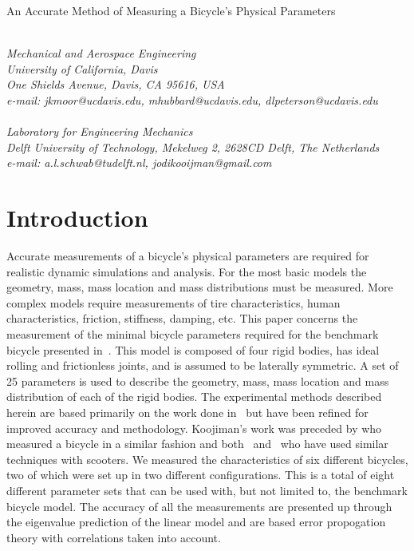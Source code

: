 \documentclass{bmd2010a}
\begin{document}
\begin{flushleft}
{\fontsize{16pt}{20pt}\selectfont%
  An Accurate Method of Measuring a Bicycle's Physical Parameters\\}
\end{flushleft}

\begin{flushleft}
  {\\}
  \textit{Mechanical and Aerospace Engineering\\
          University of California, Davis\\
          One Shields Avenue, Davis, CA 95616, USA\\
          e-mail: jkmoor@ucdavis.edu, mhubbard@ucdavis.edu,
          dlpeterson@ucdavis.edu
  }\vspace{10pt}\\
  {\\}
  \textit{Laboratory for Engineering Mechanics\\
          Delft University of Technology, Mekelweg 2, 2628CD Delft, The
          Netherlands\\
          e-mail: a.l.schwab@tudelft.nl, jodikooijman@gmail.com
  }\vspace{10pt}\\
\end{flushleft}

\section*{Introduction}
Accurate measurements of a bicycle's physical parameters are required for
realistic dynamic simulations and analysis. For the most basic models the
geometry, mass, mass location and mass distributions must be measured. More complex models
require measurements of tire characteristics, human characteristics, friction, stiffness, damping, etc. This
paper concerns the measurement of the minimal bicycle parameters required for
the benchmark bicycle presented in~\cite{Meijaard2007}. This
model is composed of four rigid bodies, has ideal rolling and frictionless joints,
and is assumed to be laterally symmetric. A set of 25
parameters is used to describe the geometry, mass, mass location and
mass distribution of each of the rigid bodies. The experimental methods
described herein are based primarily on the work
done in~\cite{Kooijman2006} but have been refined for improved accuracy and
methodology. Koojiman's work was preceded by \cite{Roland1971} who measured a bicycle in a
similar fashion and both~\cite{Dohring1953} and~\cite{Singh1971} who have used
similar techniques with scooters. We measured the characteristics of six
different bicycles, two of which were set up in two different configurations.
This is a total of eight different parameter sets that can be used with, but not
limited to, the benchmark bicycle model. The accuracy of all the measurements
are presented up through the eigenvalue prediction of the linear model and are
based error propogation theory with correlations taken into account.
\end{document}
